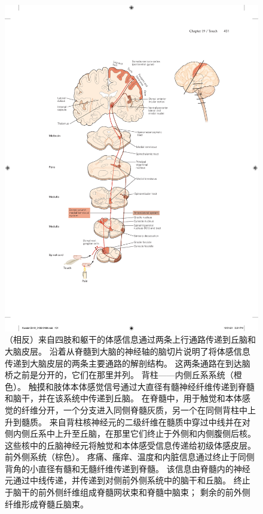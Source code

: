 \begin{figure}[htbp]
	\centering
	\includegraphics[width=1.0\linewidth]{chap19/fig_19_11}
	\caption{（相反）来自四肢和躯干的体感信息通过两条上行通路传递到丘脑和大脑皮层。 
		沿着从脊髓到大脑的神经轴的脑切片说明了将体感信息传递到大脑皮层的两条主要通路的解剖结构。 
		这两条通路在到达脑桥之前是分开的，它们在那里并列。 
		背柱——内侧丘系系统（橙色）。 
		触摸和肢体本体感觉信号通过大直径有髓神经纤维传递到脊髓和脑干，并在该系统中传递到丘脑。 
		在脊髓中，用于触觉和本体感觉的纤维分开，一个分支进入同侧脊髓灰质，另一个在同侧背柱中上升到髓质。 
		来自背柱核神经元的二级纤维在髓质中穿过中线并在对侧内侧丘系中上升至丘脑，在那里它们终止于外侧和内侧腹侧后核。 
		这些核中的丘脑神经元将触觉和本体感受信息传递给初级体感皮层。 前外侧系统（棕色）。 
		疼痛、瘙痒、温度和内脏信息通过终止于同侧背角的小直径有髓和无髓纤维传递到脊髓。 
		该信息由脊髓内的神经元通过中线传递，并传递到对侧前外侧系统中的脑干和丘脑。 
		终止于脑干的前外侧纤维组成脊髓网状束和脊髓中脑束； 剩余的前外侧纤维形成脊髓丘脑束。}
	\label{fig:19_11}
\end{figure}

